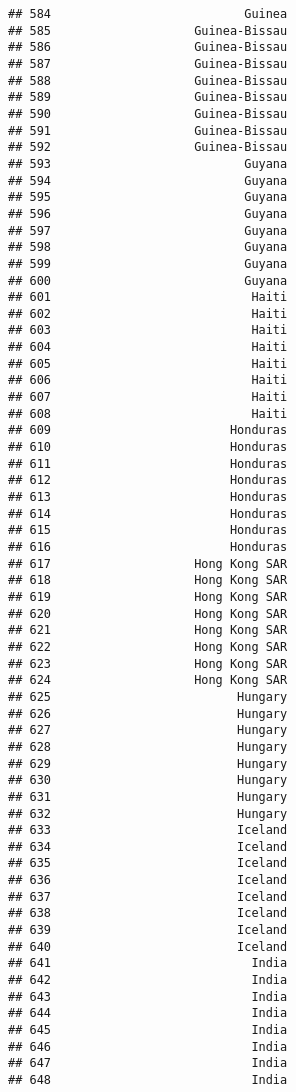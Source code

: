 \documentclass[]{article}
\begin{document}
\begin{verbatim}
## 584                           Guinea
## 585                    Guinea-Bissau
## 586                    Guinea-Bissau
## 587                    Guinea-Bissau
## 588                    Guinea-Bissau
## 589                    Guinea-Bissau
## 590                    Guinea-Bissau
## 591                    Guinea-Bissau
## 592                    Guinea-Bissau
## 593                           Guyana
## 594                           Guyana
## 595                           Guyana
## 596                           Guyana
## 597                           Guyana
## 598                           Guyana
## 599                           Guyana
## 600                           Guyana
## 601                            Haiti
## 602                            Haiti
## 603                            Haiti
## 604                            Haiti
## 605                            Haiti
## 606                            Haiti
## 607                            Haiti
## 608                            Haiti
## 609                         Honduras
## 610                         Honduras
## 611                         Honduras
## 612                         Honduras
## 613                         Honduras
## 614                         Honduras
## 615                         Honduras
## 616                         Honduras
## 617                    Hong Kong SAR
## 618                    Hong Kong SAR
## 619                    Hong Kong SAR
## 620                    Hong Kong SAR
## 621                    Hong Kong SAR
## 622                    Hong Kong SAR
## 623                    Hong Kong SAR
## 624                    Hong Kong SAR
## 625                          Hungary
## 626                          Hungary
## 627                          Hungary
## 628                          Hungary
## 629                          Hungary
## 630                          Hungary
## 631                          Hungary
## 632                          Hungary
## 633                          Iceland
## 634                          Iceland
## 635                          Iceland
## 636                          Iceland
## 637                          Iceland
## 638                          Iceland
## 639                          Iceland
## 640                          Iceland
## 641                            India
## 642                            India
## 643                            India
## 644                            India
## 645                            India
## 646                            India
## 647                            India
## 648                            India

\end{verbatim}
\end{document}
